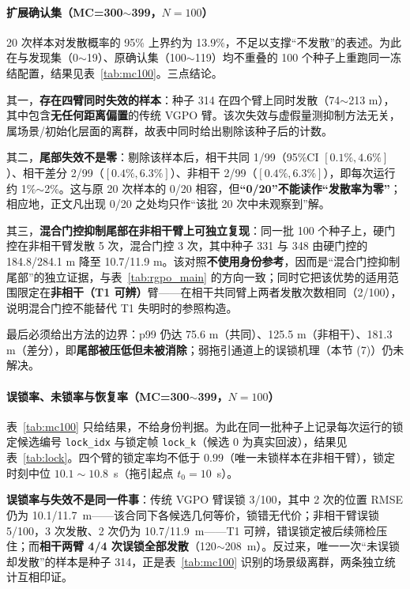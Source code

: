 \documentclass[UTF8,a4paper,zihao=-4]{ctexart}
\begin{document}
\paragraph{扩展确认集（MC=300$\sim$399，$N=100$）} 20 次样本对发散概率的 95\% 上界约为 13.9\%，不足以支撑“不发散”的表述。为此在与发现集（0$\sim$19）、原确认集（100$\sim$119）均不重叠的 100 个种子上重跑同一冻结配置，结果见表~\ref{tab:mc100}。三点结论。

其一，\textbf{存在四臂同时失效的样本}：种子 314 在四个臂上同时发散（74$\sim$213 m），其中包含\textbf{无任何距离偏置}的传统 VGPO 臂。该次失效与虚假量测抑制方法无关，属场景/初始化层面的离群，故表中同时给出剔除该种子后的计数。

其二，\textbf{尾部失效不是零}：剔除该样本后，相干共同 1/99（95\%CI $[0.1\%,4.6\%]$）、相干差分 2/99（$[0.4\%,6.3\%]$）、非相干 2/99（$[0.4\%,6.3\%]$），即每次运行约 1\%$\sim$2\%。这与原 20 次样本的 0/20 相容，但\textbf{“0/20”不能读作“发散率为零”}；相应地，正文凡出现 0/20 之处均只作“该批 20 次中未观察到”解。

其三，\textbf{混合门控抑制尾部在非相干臂上可独立复现}：同一批 100 个种子上，硬门控在非相干臂发散 5 次，混合门控 3 次，其中种子 331 与 348 由硬门控的 184.8/284.1 m 降至 10.7/11.9 m。该对照\textbf{不使用身份参考}，因而是“混合门控抑制尾部”的独立证据，与表~\ref{tab:rgpo_main} 的方向一致；同时它把该优势的适用范围限定在\textbf{非相干（T1 可辨）}臂——在相干共同臂上两者发散次数相同（2/100），说明混合门控不能替代 T1 失明时的参照构造。

最后必须给出方法的边界：p99 仍达 75.6 m（共同）、125.5 m（非相干）、181.3 m（差分），即\textbf{尾部被压低但未被消除}；弱拖引通道上的误锁机理（本节 (7)）仍未解决。

\paragraph{误锁率、未锁率与恢复率（MC=300$\sim$399，$N=100$）} 表~\ref{tab:mc100} 只给结果，不给身份判据。为此在同一批种子上记录每次运行的锁定候选编号 \texttt{lock\_idx} 与锁定帧 \texttt{lock\_k}（候选 0 为真实回波），结果见表~\ref{tab:lock}。四个臂的锁定率均不低于 $0.99$（唯一未锁样本在非相干臂），锁定时刻中位 $10.1\sim10.8$~s（拖引起点 $t_0=10$~s）。

\textbf{误锁率与失效不是同一件事}：传统 VGPO 臂误锁 3/100，其中 2 次的位置 RMSE 仍为 10.1/11.7~m——该合同下各候选几何等价，锁错无代价；非相干臂误锁 5/100，3 次发散、2 次仍为 10.7/11.9~m——T1 可辨，错误锁定被后续筛检压住；而\textbf{相干两臂 4/4 次误锁全部发散}（120$\sim$208~m）。反过来，唯一一次“未误锁却发散”的样本是种子 314，正是表~\ref{tab:mc100} 识别的场景级离群，两条独立统计互相印证。
\end{document}
